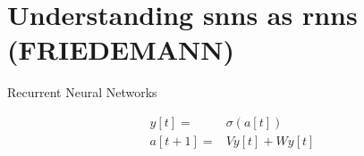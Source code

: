 \documentclass[journal,onecolumn,11pt]{IEEEtran}
\begin{document}
%
%
%
%
%

\section{Understanding \glspl{snn} as \glspl{rnn} (FRIEDEMANN)}
\label{sec:understanding_ssn_as_rnn}

\begin{infobox}
  \begin{mdframed}[backgroundcolor=black!10]\small
  \caption{Recurrent Neural Networks}
    \begin{align}
    y[t] = & \sigma(a[t]) \\
    a[t+1] = & V y[t] + W y[t]
    \end{align}
    
%    
%    

  \end{mdframed}
\end{infobox}
\end{document}
